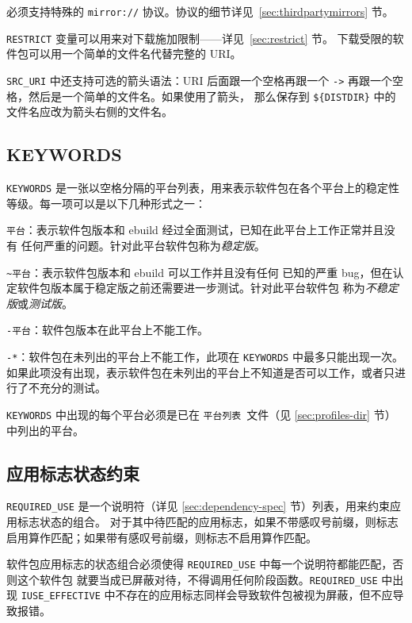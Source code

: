 必须支持特殊的 \texttt{mirror://} 协议。协议的细节详见~\ref{sec:thirdpartymirrors} 节。

\texttt{RESTRICT} 变量可以用来对下载施加限制——详见~\ref{sec:restrict} 节。
下载受限的软件包可以用一个简单的文件名代替完整的 URI。

\texttt{SRC_URI} 中还支持可选的箭头语法：URI 后面跟一个空格再跟一个 \texttt{->}
再跟一个空格，然后是一个简单的文件名。如果使用了箭头，
那么保存到 \texttt{\$\{DISTDIR\}} 中的文件名应改为箭头右侧的文件名。

\subsection{KEYWORDS}
\label{sec:keywords}

\texttt{KEYWORDS} 是一张以空格分隔的平台列表，用来表示软件包在各个平台上的稳定性等级。每一项可以是以下几种形式之一：
\begin{compactitem}
\item \texttt{平台}：表示软件包版本和 ebuild 经过全面测试，已知在此平台上工作正常并且没有
    任何严重的问题。针对此平台软件包称为\textit{稳定版}。
\item \texttt{\textasciitilde\hspace{0em}平台}：表示软件包版本和 ebuild 可以工作并且没有任何
    已知的严重 bug，但在认定软件包版本属于稳定版之前还需要进一步测试。针对此平台软件包
    称为\textit{不稳定版}或\textit{测试版}。
\item \texttt{-平台}：软件包版本在此平台上不能工作。
\item \texttt{-*}：软件包在未列出的平台上不能工作，此项在 \texttt{KEYWORDS} 中最多只能出现一次。
    如果此项没有出现，表示软件包在未列出的平台上不知道是否可以工作，或者只进行了不充分的测试。
\end{compactitem}

\texttt{KEYWORDS} 中出现的每个平台必须是已在 \texttt{平台列表}\ 文件（见
\ref{sec:profiles-dir} 节）中列出的平台。

\subsection{应用标志状态约束}
\label{sec:required-use}

\texttt{REQUIRED_USE} 是一个说明符（详见 \ref{sec:dependency-spec} 节）列表，用来约束应用标志状态的组合。
对于其中待匹配的应用标志，如果不带感叹号前缀，则标志启用算作匹配；如果带有感叹号前缀，则标志不启用算作匹配。

软件包应用标志的状态组合必须使得 \texttt{REQUIRED_USE} 中每一个说明符都能匹配，否则这个软件包
就要当成已屏蔽对待，不得调用任何阶段函数。\texttt{REQUIRED_USE} 中出现 \texttt{IUSE_EFFECTIVE}
中不存在的应用标志同样会导致软件包被视为屏蔽，但不应导致报错。


